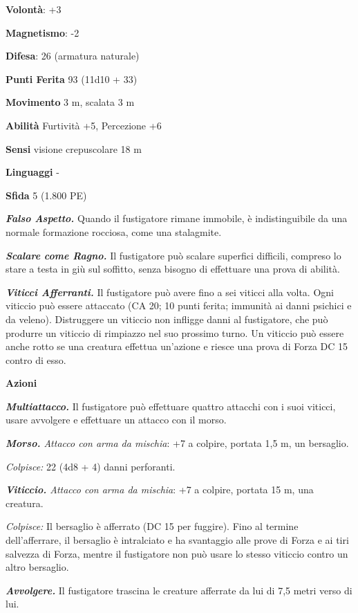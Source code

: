 \begin{multicols}{2}
\textbf{Volontà}: +3

\textbf{Magnetismo}: -2

\textbf{Difesa}: 26 (armatura naturale)

\textbf{Punti Ferita} 93 (11d10 + 33)

\textbf{Movimento} 3 m, scalata 3 m

\textbf{Abilità} Furtività +5, Percezione +6

\textbf{Sensi} visione crepuscolare 18 m

\textbf{Linguaggi} -

\textbf{Sfida} 5 (1.800 PE)

\emph{\textbf{Falso Aspetto.}} Quando il fustigatore rimane immobile, è
indistinguibile da una normale formazione rocciosa, come una stalagmite.

\emph{\textbf{Scalare come Ragno.}} Il fustigatore può scalare superfici
difficili, compreso lo stare a testa in giù sul soffitto, senza bisogno
di effettuare una prova di abilità.

\emph{\textbf{Viticci Afferranti.}} Il fustigatore può avere fino a sei
viticci alla volta. Ogni viticcio può essere attaccato (CA 20; 10 punti
ferita; immunità ai danni psichici e da veleno). Distruggere un viticcio
non infligge danni al fustigatore, che può produrre un viticcio di
rimpiazzo nel suo prossimo turno. Un viticcio può essere anche rotto se
una creatura effettua un'azione e riesce una prova di Forza DC 15 contro
di esso.

\textbf{Azioni}

\emph{\textbf{Multiattacco.}} Il fustigatore può effettuare quattro
attacchi con i suoi viticci, usare avvolgere e effettuare un attacco con
il morso.

\emph{\textbf{Morso.} Attacco con arma da mischia}: +7 a colpire,
portata 1,5 m, un bersaglio.

\emph{Colpisce:} 22 (4d8 + 4) danni perforanti.

\emph{\textbf{Viticcio.} Attacco con arma da mischia}: +7 a colpire,
portata 15 m, una creatura.

\emph{Colpisce:} Il bersaglio è afferrato (DC 15 per fuggire). Fino al
termine dell'afferrare, il bersaglio è intralciato e ha svantaggio alle
prove di Forza e ai tiri salvezza di Forza, mentre il fustigatore non
può usare lo stesso viticcio contro un altro bersaglio.

\emph{\textbf{Avvolgere.}} Il fustigatore trascina le creature afferrate
da lui di 7,5 metri verso di lui.


\end{multicols}
